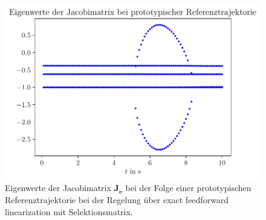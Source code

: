 \begin{figure}[ht]
	\begin{center}
		\includegraphics[scale=1]{Pictures/feedforward_lin_selec_ljapunov1}
	\end{center}
	\caption[Eigenwerte der Jacobimatrix bei Trajektorienfolge mit Regelung über exact feedforward linearization (Selektionsmatrix)]
	{Eigenwerte der Jacobimatrix $\mathbf{J}_{\dot{\mathbf{e}}}$ bei der Folge einer prototypischen Referenztrajektorie bei der Regelung über exact feedforward linearization mit Selektionsmatrix.}
	\label{fig_feedforward_selec_controller_ljapunov1}
\end{figure}

